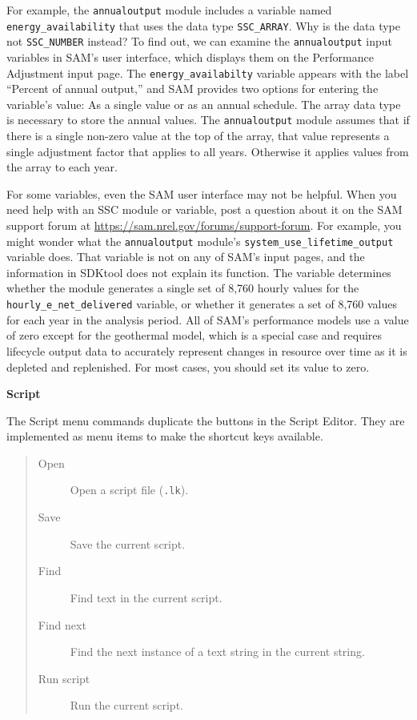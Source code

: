 \documentclass{scrartcl} %
\begin{document}
For example, the \texttt{annualoutput} module includes a variable named \texttt{energy\_availability} that uses the data type \texttt{SSC\_ARRAY}. Why is the data type not \texttt{SSC\_NUMBER} instead? To find out, we can examine the \texttt{annualoutput} input variables in SAM's user interface, which displays them on the Performance Adjustment input page. The \texttt{energy\_availabilty} variable appears with the label ``Percent of annual output,'' and SAM provides two options for entering the variable's value: As a single value or as an annual schedule. The array data type is necessary to store the annual values. The \texttt{annualoutput} module assumes that if there is a single non-zero value at the top of the array, that value represents a single adjustment factor that applies to all years. Otherwise it applies values from the array to each year.

For some variables, even the SAM user interface may not be helpful. When you need help with an SSC module or variable, post a question about it on the SAM support forum at \url{https://sam.nrel.gov/forums/support-forum}. For example, you might wonder what the \texttt{annualoutput} module's \texttt{system\_use\_lifetime\_output} variable does. That variable is not on any of SAM's input pages, and the information in SDKtool does not explain its function. The variable determines whether the module generates a single set of 8,760 hourly values for the \texttt{hourly\_e\_net\_delivered} variable, or whether it generates a set of 8,760 values for each year in the analysis period. All of SAM's performance models use a value of zero except for the geothermal model, which is a special case and requires lifecycle output data to accurately represent changes in resource over time as it is depleted and replenished. For most cases, you should set its value to zero.

\textbf{Script}

The Script menu commands duplicate the buttons in the Script Editor. They are implemented as menu items to make the shortcut keys available.

\begin{quote}
\begin{description}
\item[Open] Open a script file (\texttt{.lk}).
\item[Save] Save the current script.
\item[Find] Find text in the current script.
\item[Find next] Find the next instance of a text string in the current string.
\item[Run script] Run the current script. 
\end{description}
\end{quote}
\end{document}
